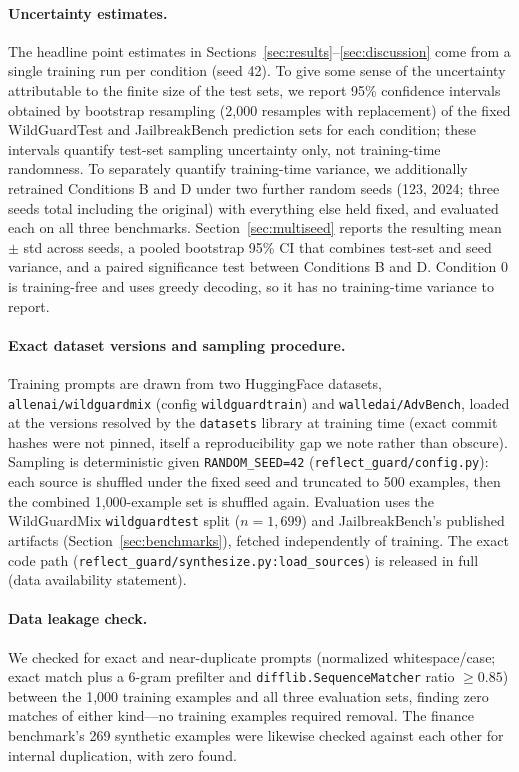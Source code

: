 \documentclass[superintelligence,article,submit,pdftex,moreauthors]{Definitions/mdpi}
\begin{document}
\paragraph{Uncertainty estimates.} The headline point estimates in Sections~\ref{sec:results}--\ref{sec:discussion} come from a single training run per condition (seed 42). To give some sense of the uncertainty attributable to the finite size of the test sets, we report 95\% confidence intervals obtained by bootstrap resampling (2{,}000 resamples with replacement) of the fixed WildGuardTest and JailbreakBench prediction sets for each condition; these intervals quantify test-set sampling uncertainty only, not training-time randomness. To separately quantify training-time variance, we additionally retrained Conditions B and D under two further random seeds (123, 2024; three seeds total including the original) with everything else held fixed, and evaluated each on all three benchmarks. Section~\ref{sec:multiseed} reports the resulting mean $\pm$ std across seeds, a pooled bootstrap 95\% CI that combines test-set and seed variance, and a paired significance test between Conditions B and D. Condition 0 is training-free and uses greedy decoding, so it has no training-time variance to report.

\paragraph{Exact dataset versions and sampling procedure.} Training prompts are drawn from two HuggingFace datasets, \texttt{allenai/wildguardmix} (config \texttt{wildguardtrain}) and \texttt{walledai/AdvBench}, loaded at the versions resolved by the \texttt{datasets} library at training time (exact commit hashes were not pinned, itself a reproducibility gap we note rather than obscure). Sampling is deterministic given \texttt{RANDOM\_SEED=42} (\texttt{reflect\_guard/config.py}): each source is shuffled under the fixed seed and truncated to 500 examples, then the combined 1{,}000-example set is shuffled again. Evaluation uses the WildGuardMix \texttt{wildguardtest} split ($n=1{,}699$) and JailbreakBench's published artifacts (Section~\ref{sec:benchmarks}), fetched independently of training. The exact code path (\texttt{reflect\_guard/synthesize.py:load\_sources}) is released in full (data availability statement).

\paragraph{Data leakage check.} We checked for exact and near-duplicate prompts (normalized whitespace/case; exact match plus a 6-gram prefilter and \texttt{difflib.SequenceMatcher} ratio $\geq 0.85$) between the 1{,}000 training examples and all three evaluation sets, finding zero matches of either kind---no training examples required removal. The finance benchmark's 269 synthetic examples were likewise checked against each other for internal duplication, with zero found.
\end{document}

